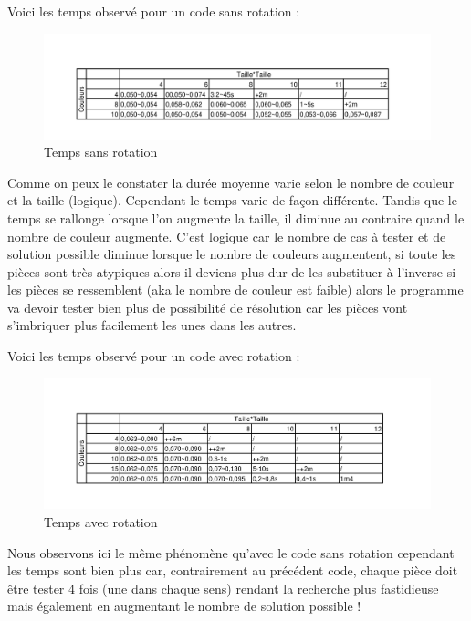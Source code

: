 \documentclass[french]{rapport}
\begin{document}
Voici les temps observé pour un code sans rotation :

\begin{figure}
  \includegraphics[width=\linewidth]{img/TimeNR.png}
  \caption{Temps sans rotation}
  \label{img:timeNR}
\end{figure}

Comme on peux le constater la durée moyenne varie selon le nombre de couleur et la taille (logique). Cependant le temps varie de façon différente. Tandis que le temps se rallonge lorsque l'on augmente la taille, il diminue au contraire quand le nombre de couleur augmente. C'est logique car le nombre de cas à tester et de solution possible diminue lorsque le nombre de couleurs augmentent, si toute les pièces sont très atypiques alors il deviens plus dur de les substituer à l'inverse si les pièces se ressemblent (aka le nombre de couleur est faible) alors le programme va devoir tester bien plus de possibilité de résolution car les pièces vont s'imbriquer plus facilement les unes dans les autres.

Voici les temps observé pour un code avec rotation :

\begin{figure}
  \includegraphics[width=\linewidth]{img/TimeR.png}
  \caption{Temps avec rotation}
  \label{img:timeR}
\end{figure}

Nous observons ici le même phénomène qu'avec le code sans rotation cependant les temps sont bien plus car, contrairement au précédent code, chaque pièce doit être tester 4 fois (une dans chaque sens) rendant la recherche plus fastidieuse mais également en augmentant le nombre de solution possible ! 
\end{document}

